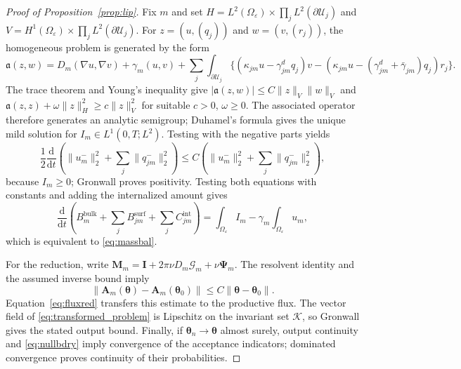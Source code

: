 \documentclass[pdflatex,sn-mathphys-num]{sn-jnl}
\numberwithin{equation}{section}
\theoremstyle{thmstyleone}%
\theoremstyle{definition}
\theoremstyle{remark}
\begin{document}
\begin{appendices}
\begin{proof}[Proof of Proposition~\ref{prop:lip}]
Fix $m$ and set
$H=L^2(\Omega_\varepsilon)\times\prod_jL^2(\partial\mathcal U_j)$ and
$V=H^1(\Omega_\varepsilon)\times\prod_jL^2(\partial\mathcal U_j)$.
For $z=(u,(q_j))$ and $w=(v,(r_j))$, the homogeneous problem is generated by
the form
\[
\mathfrak a(z,w)=D_m(\nabla u,\nabla v)+\gamma_m(u,v)
+\sum_j\!\int_{\partial\mathcal U_j}
\{(\kappa_{jm}u-\gamma^d_{jm}q_j)v
-(\kappa_{jm}u-(\gamma^d_{jm}+\bar\gamma_{jm})q_j)r_j\}.
\]
The trace theorem and Young's inequality give
$|\mathfrak a(z,w)|\le C\|z\|_V\|w\|_V$ and
$\mathfrak a(z,z)+\omega\|z\|_H^2\ge c\|z\|_V^2$ for suitable
$c>0$, $\omega\ge0$. The associated operator therefore generates an analytic
semigroup; Duhamel's formula gives the unique mild solution for
$I_m\in L^1(0,T;L^2)$. Testing with the negative parts yields
\[
\frac12\frac{\mathrm d}{\mathrm dt}
\left(\|u_m^-\|_2^2+\sum_j\|q_{jm}^-\|_2^2\right)
\le C\left(\|u_m^-\|_2^2+\sum_j\|q_{jm}^-\|_2^2\right),
\]
because $I_m\ge0$; Gronwall proves positivity. Testing both equations with
constants and adding the internalized amount gives
\[
\frac{\mathrm d}{\mathrm dt}\left(
B_m^{\mathrm{bulk}}+\sum_jB_{jm}^{\mathrm{surf}}
+\sum_jC_{jm}^{\mathrm{int}}\right)
=\int_{\Omega_\varepsilon}I_m
-\gamma_m\int_{\Omega_\varepsilon}u_m,
\]
which is equivalent to \eqref{eq:massbal}.

For the reduction, write
$\mathbf M_m=\mathbf I+2\pi\nu D_m\bm{\mathcal G}_m+\nu\bm\Psi_m$.
The resolvent identity and the assumed inverse bound imply
\[
\|\mathbf A_m(\boldsymbol\theta)-\mathbf A_m(\boldsymbol\theta_0)\|
\le C\|\boldsymbol\theta-\boldsymbol\theta_0\|.
\]
Equation~\eqref{eq:fluxred} transfers this estimate to the productive flux.
The vector field of \eqref{eq:transformed_problem} is Lipschitz on the invariant
set $\mathcal K$, so Gronwall gives the stated output bound. Finally, if
$\boldsymbol\theta_n\to\boldsymbol\theta$ almost surely, output continuity and
\eqref{eq:nullbdry} imply convergence of the acceptance indicators; dominated
convergence proves continuity of their probabilities.
\end{proof}




\end{appendices}
\end{document}
